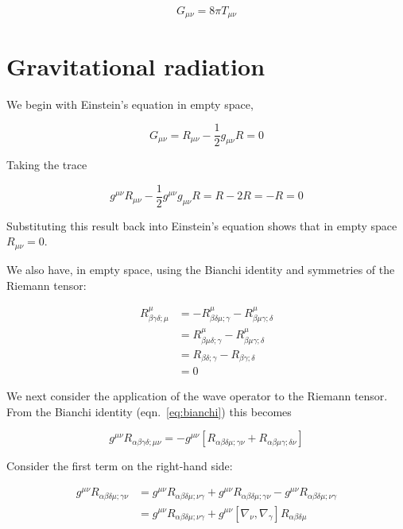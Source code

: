 \begin{equation}
G_{\mu\nu} = 8\pi T_{\mu\nu}
\end{equation}


\section{Gravitational radiation}

We begin with Einstein's equation in empty space,

\begin{equation*}
G_{\mu\nu} = R_{\mu\nu} - \frac{1}{2} g_{\mu\nu} R = 0
\end{equation*}

Taking the trace

\begin{equation*}
g^{\mu\nu} R_{\mu\nu} - \frac{1}{2} g^{\mu\nu} g_{\mu\nu} R 
= R - 2 R = -R = 0
\end{equation*}

Substituting this result back into Einstein's equation shows that in
empty space $R_{\mu\nu} = 0$.

We also have, in empty space, using the Bianchi identity and
symmetries of the Riemann tensor:

\begin{align*}
\label{eq:divergence_in_empty_space}
R^\mu_{\beta\gamma\delta;\mu} &= 
-R^\mu_{\beta\delta\mu;\gamma}  
-R^\mu_{\beta\mu\gamma;\delta} \\ 
&= R^\mu_{\beta\mu\delta;\gamma}  
-R^\mu_{\beta\mu\gamma;\delta} \\
&= R_{\beta\delta;\gamma}  
-R_{\beta\gamma;\delta} \\
&= 0
\end{align*}

We next consider the application of the wave operator to the Riemann
tensor.  From the Bianchi identity (eqn.~\ref{eq:bianchi}) this becomes

\begin{equation*}
\label{eq:wave_expanded}
g^{\mu\nu} R_{\alpha\beta\gamma\delta;\mu\nu}
= - g^{\mu\nu}
\left[R_{\alpha\beta\delta\mu;\gamma\nu}
+ R_{\alpha\beta\mu\gamma;\delta\nu} \right]
\end{equation*}

Consider the first term on the right-hand side:

\begin{align*}
g^{\mu\nu} R_{\alpha\beta\delta\mu;\gamma\nu}
&= g^{\mu\nu} R_{\alpha\beta\delta\mu;\nu\gamma}
+ g^{\mu\nu} R_{\alpha\beta\delta\mu;\gamma\nu}
- g^{\mu\nu} R_{\alpha\beta\delta\mu;\nu\gamma} \\
&= g^{\mu\nu} R_{\alpha\beta\delta\mu;\nu\gamma}
+ g^{\mu\nu} 
\left[\nabla_\nu,\nabla_\gamma\right] R_{\alpha\beta\delta\mu}
\end{align*}

